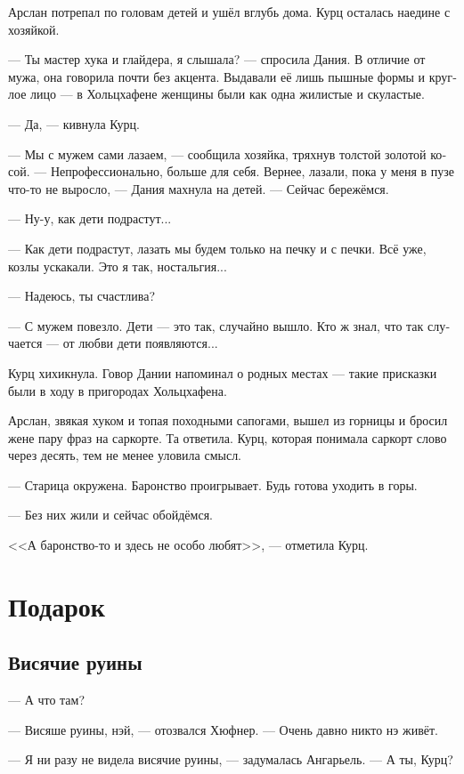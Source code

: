 \documentclass[a4paper,12pt,fleqn]{book}\usepackage{polyglossia}\setdefaultlanguage[babelshorthands=true]{russian}\setotherlanguage{english}\defaultfontfeatures{Ligatures=TeX,Mapping=tex-text}\usepackage{xcolor}\newcommand{\ml}[3]{#2}
\begin{document}
Арслан потрепал по головам детей и ушёл вглубь дома.
Курц осталась наедине с хозяйкой.

--- Ты мастер хука и глайдера, я слышала? --- спросила Дания.
В отличие от мужа, она говорила почти без акцента.
Выдавали её лишь пышные формы и круглое лицо --- в Хольцхафене женщины были как одна жилистые и скуластые.

--- Да, --- кивнула Курц.

--- Мы с мужем сами лазаем, --- сообщила хозяйка, тряхнув толстой золотой косой.
--- Непрофессионально, больше для себя.
Вернее, лазали, пока у меня в пузе что-то не выросло, --- Дания махнула на детей.
--- Сейчас бережёмся.

--- Ну-у, как дети подрастут...

--- Как дети подрастут, лазать мы будем только на печку и с печки.
Всё уже, козлы ускакали.
Это я так, ностальгия...

--- Надеюсь, ты счастлива?

--- С мужем повезло.
Дети --- это так, случайно вышло.
Кто ж знал, что так случается --- от любви дети появляются...

Курц хихикнула.
Говор Дании напоминал о родных местах --- такие присказки были в ходу в пригородах Хольцхафена.

Арслан, звякая хуком и топая походными сапогами, вышел из горницы и бросил жене пару фраз на саркорте.
Та ответила.
Курц, которая понимала саркорт слово через десять, тем не менее уловила смысл.

--- Старица окружена.
Баронство проигрывает.
Будь готова уходить в горы.

--- Без них жили и сейчас обойдёмся.

<<А баронство-то и здесь не особо любят>>, --- отметила Курц.


\chapter{Подарок}

\section{Висячие руины}

--- А что там?

--- Висяше руины, нэй, --- отозвался Хюфнер.
--- Очень давно никто нэ живёт.

--- Я ни разу не видела висячие руины, --- задумалась Ангарьель.
--- А ты, Курц?
\end{document}
